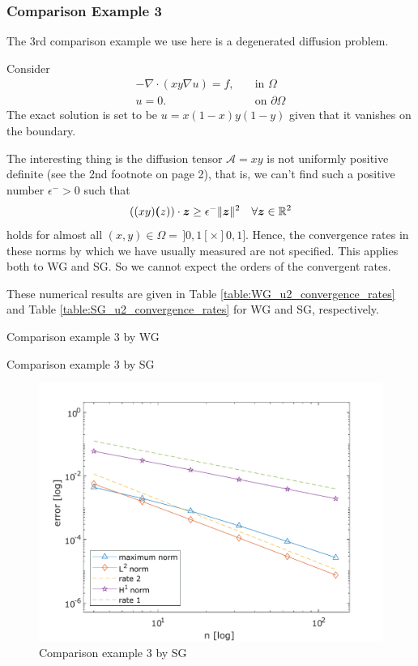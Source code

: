 	\subsubsection*{Comparison Example 3}
	The 3rd comparison example we use here is a degenerated diffusion problem.
	
	Consider
	\begin{align*}
		-\nabla \cdot(xy\nabla u)=f,\quad &\textrm{in } \Omega\\
		u=0. \quad &\textrm{on } \partial\Omega
	\end{align*}
	The exact solution is set to be $u=x(1-x)y(1-y)$ given that it vanishes on 
	the boundary.

	The interesting thing is the diffusion tensor $\mathcal{A}=xy$ is not
	uniformly positive definite (see the 2nd footnote on page 2), that is,
	we can't find such a positive number $\epsilon^- >0$ such that
	\[ ((xy) \bm(z))\cdot \bm{z} \geq \epsilon^- \lVert\bm{z}\rVert^2 
		\quad \forall\bm{z}\in\mathbb{R}^2\]
	holds for almost all $(x,y)\in\Omega=\,]0,1[\times]0,1]$.
	Hence, the convergence rates in these norms by which we have usually 
	measured are not specified. This applies both to WG and SG. So we cannot 
	expect the orders of the convergent rates.
	
	These numerical results are given in Table 
	\ref{table:WG_u2_convergence_rates}	and Table 
	\ref{table:SG_u2_convergence_rates} for WG and SG, respectively. 
	
		

	\begin{table}[!htbp]
	\begin{mdframed}[linecolor=red,linewidth=.5pt,roundcorner=10pt]
		\centering
		\caption{Comparison example 3 by WG}\vspace{-5pt}
		
		\label{table:WG_u2_convergence_rates}
		\vspace{10pt}
		\caption{Comparison example 3 by SG}\vspace{-5pt}
		
		\label{table:SG_u2_convergence_rates}
	\end{mdframed}
	\end{table}\vspace{-5pt}
			
	\begin{figure}[!htbp]
		\centering
		\includegraphics[width=0.7\linewidth]{svg/u2}
		\caption{Comparison example 3 by SG}
		\label{fig:u2}
	\end{figure}
	
